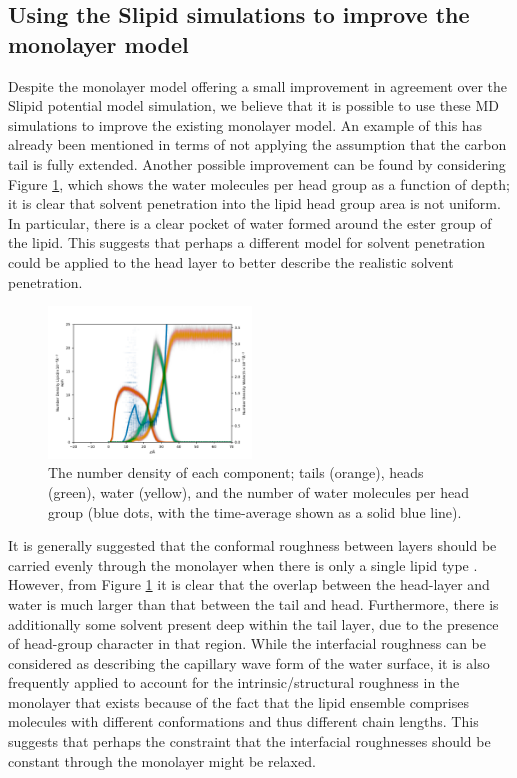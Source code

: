 \documentclass[amsmath,amssymb,twocolumn,superscriptaddress]{revtex4-1}
\begin{document}
\subsection{Using the Slipid simulations to improve the monolayer model}
Despite the monolayer model offering a small improvement in agreement over the Slipid potential model simulation, we believe that it is possible to use these MD simulations to improve the existing monolayer model.
An example of this has already been mentioned in terms of not applying the assumption that the carbon tail is fully extended.
Another possible improvement can be found by considering Figure \ref{fig:nb}, which shows the water molecules per head group as a function of depth; it is clear that solvent penetration into the lipid head group area is not uniform.
In particular, there is a clear pocket of water formed around the ester group of the lipid.
This suggests that perhaps a different model for solvent penetration could be applied to the head layer to better describe the realistic solvent penetration.
%
\begin{figure}
\centering
  \includegraphics[width=0.48\textwidth]{number_density}
  \caption{The number density of each component; tails (orange), heads (green), water (yellow), and the number of water molecules per head group (blue dots, with the time-average shown as a solid blue line).}
  \label{fig:nb}
\end{figure}
%

It is generally suggested that the conformal roughness between layers should be carried evenly through the monolayer when there is only a single lipid type \cite{Campbell2018}.
However, from Figure \ref{fig:nb} it is clear that the overlap between the head-layer and water is much larger than that between the tail and head.
Furthermore, there is additionally some solvent present deep within the tail layer, due to the presence of head-group character in that region.
While the interfacial roughness can be considered as describing the capillary wave form of the water surface, it is also frequently applied to account for the intrinsic/structural roughness in the monolayer that exists because of the fact that the lipid ensemble comprises molecules with different conformations and thus different chain lengths.
This suggests that perhaps the constraint that the interfacial roughnesses should be constant through the monolayer might be relaxed.
\end{document}
